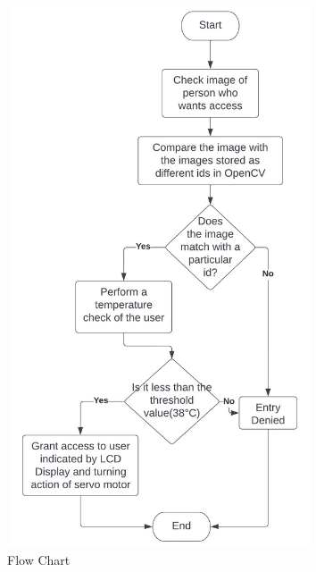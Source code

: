 \documentclass[conference]{IEEEtran}
\begin{document}
	\begin{figure}
		\centering
		\includegraphics[width=9cm, height=16cm]{flow chart (1).jpg}
		\caption{\label{fig:caption}Flow Chart}
	\end{figure}
\end{document}
